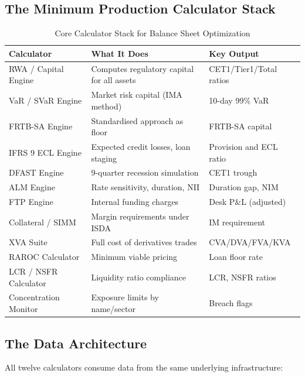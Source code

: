 \documentclass[12pt,a4paper]{article}
\begin{document}
\subsection{The Minimum Production Calculator Stack}

\begin{table}[H]
  \centering
  \caption{Core Calculator Stack for Balance Sheet Optimization}
  \begin{tabular}{lll}
    \toprule
    Calculator & What It Does & Key Output \\
    \midrule
    RWA / Capital Engine & Computes regulatory capital for all assets & CET1/Tier1/Total ratios \\
    VaR / SVaR Engine & Market risk capital (IMA method) & 10-day 99\% VaR \\
    FRTB-SA Engine & Standardised approach as floor & FRTB-SA capital \\
    IFRS 9 ECL Engine & Expected credit losses, loan staging & Provision and ECL ratio \\
    DFAST Engine & 9-quarter recession simulation & CET1 trough \\
    ALM Engine & Rate sensitivity, duration, NII & Duration gap, NIM \\
    FTP Engine & Internal funding charges & Desk P\&L (adjusted) \\
    Collateral / SIMM & Margin requirements under ISDA & IM requirement \\
    XVA Suite & Full cost of derivatives trades & CVA/DVA/FVA/KVA \\
    RAROC Calculator & Minimum viable pricing & Loan floor rate \\
    LCR / NSFR Calculator & Liquidity ratio compliance & LCR, NSFR ratios \\
    Concentration Monitor & Exposure limits by name/sector & Breach flags \\
    \bottomrule
  \end{tabular}
\end{table}

\subsection{The Data Architecture}

All twelve calculators consume data from the same underlying infrastructure:
\end{document}
